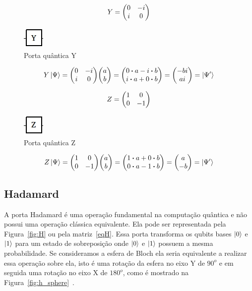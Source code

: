 \documentclass[a4paper, 12pt, oneside]{book}
\begin{document}
\begin{equation}\label{eqY}
Y =  \mqty(0&-i\\i&0)
\end{equation}

\begin{figure}[H]
\centering
\includegraphics[scale=0.75]{y.jpg}
\caption{Porta quântica Y}
\label{fig:y}
\end{figure}

\begin{align*}
Y\ket{\Psi} = \mqty(0&-i\\i&0)\mqty(a\\b) = \mqty(0 \vdot a-i \vdot b \\i \vdot a+0 \vdot b) = \mqty(-bi\\ai) = \ket{\Psi'}
\end{align*}

\begin{equation}\label{eqZ}
Z =  \mqty(1&0\\0&-1)
\end{equation}

\begin{figure}[H]
\centering
\includegraphics[scale=0.75]{z.jpg}
\caption{Porta quântica Z}
\label{fig:z}
\end{figure}

\begin{align*}
Z\ket{\Psi} = \mqty(1&0\\0&-1)\mqty(a\\b) = \mqty(1 \vdot a+0 \vdot b \\0 \vdot a-1 \vdot b) = \mqty(a\\-b) = \ket{\Psi'}
\end{align*}

\subsection{Hadamard} 
A porta Hadamard é uma operação fundamental na computação quântica e não possui uma operação clássica equivalente. Ela pode ser representada pela Figura~\ref{fig:H} ou pela matriz~\eqref{eqH}. Essa porta transforma os qubits bases $\ket{0}$ e $\ket{1}$ para um estado de sobreposição onde $\ket{0}$ e $\ket{1}$ possuem a mesma probabilidade. Se consideramos a esfera de Bloch ela seria equivalente a realizar essa operação sobre ela, isto é uma rotação da esfera no eixo Y de $90^o$ e em seguida uma rotação no eixo X de $180^o$, como é mostrado na Figura~\ref{fig:h_sphere}~\cite{nielsen}.
\end{document}

